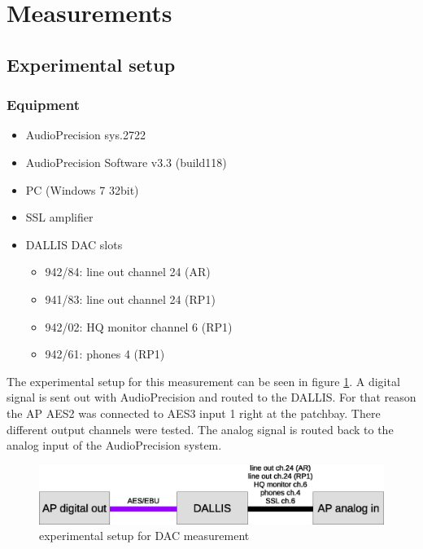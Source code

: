 \documentclass[11pt]{report}
\begin{document}
\section{Measurements}
	\subsection{Experimental setup}
		\subsubsection{Equipment}
\begin{itemize}
\item AudioPrecision sys.2722
\item AudioPrecision Software v3.3 (build118)
\item PC (Windows 7 32bit)
\item SSL amplifier
\item DALLIS DAC slots
\begin{itemize}
\item 942/84: line out channel 24 (AR)
\item 941/83: line out channel 24 (RP1)
\item 942/02: HQ monitor channel 6 (RP1)
\item 942/61: phones 4 (RP1)
\end{itemize}
\end{itemize}
The experimental setup for this measurement can be seen in figure \ref{fig:dacstructure}. A digital signal is sent out with AudioPrecision and routed to the DALLIS. For that reason the AP AES2 was connected to AES3 input 1 right at the patchbay. There different output channels were tested. The analog signal is routed back to the analog input of the AudioPrecision system. 
\begin{figure}[htbp]
\begin{center}
\includegraphics[width=14cm,keepaspectratio=true]{DACstructure}
\caption{experimental setup for DAC measurement}
\label{fig:dacstructure}
\end{center}
\end{figure}
\end{document}
